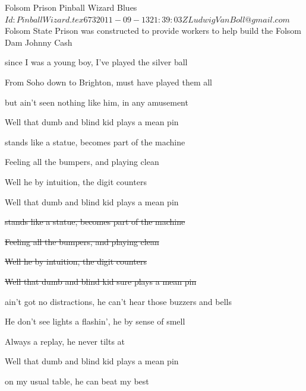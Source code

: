 \begin{SBSong}{Folsom Prison Pinball Wizard Blues}
  {$Id: PinballWizard.tex 673 2011-09-13 21:39:03Z LudwigVanBoll@gmail.com $}
  {Folsom State Prison was constructed to provide workers to help build the Folsom Dam}
  {Johnny Cash}
  \begin{SBVerse}
     since I was a young boy, I've played the silver ball
    
    From Soho down to Brighton,  must have played them all
    
    but  ain't seen nothing like him, in any amusement 
    
    Well that  dumb and blind kid  plays a mean pin
  \end{SBVerse}
  
  \begin{SBVerse}
     stands like a statue, becomes part of the machine
    
    Feeling all the bumpers, and  playing clean
    
    Well he  by intuition, the digit counters 
    
    Well that  dumb and blind kid  plays a mean pin
  \end{SBVerse}
  \begin{SBVerse}
    
    \sout{ stands like a statue, becomes part of the machine}
    
    \sout{Feeling all the bumpers, and  playing clean}
    
    \sout{Well he  by intuition, the digit counters }
    
    \sout{Well that  dumb and blind kid sure plays a mean pin}
  \end{SBVerse}
  \begin{SBVerse}
     ain't got no distractions, he can't hear those buzzers and bells
    
    He don't see lights a flashin', he  by sense of smell
    
    Always  a replay, he never tilts at 
    
    Well that  dumb and blind kid  plays a mean pin
  \end{SBVerse}
  \begin{SBVerse}
     on my usual table, he can beat my best 
    

\end{SBVerse}
\end{SBSong}
